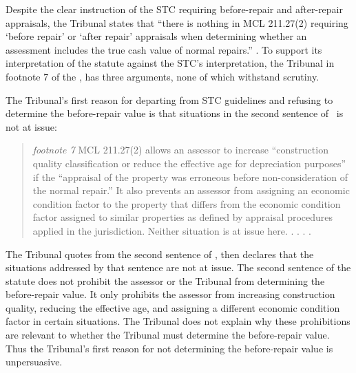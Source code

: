 \documentclass[12pt,\documentclassflag]{michiganCourtOfAppealsBrief}
\begin{document}
Despite the clear instruction of the STC requiring before-repair and after-repair appraisals, the Tribunal states that ``there is nothing in MCL 211.27(2) requiring `before repair' or `after repair' appraisals when determining whether an assessment includes the true cash value of normal repairs.'' \reconsiderationDenied[2]. To support its interpretation of the statute against the STC's interpretation,  the Tribunal in footnote 7 of the \reconsiderationDenied[2], has three arguments, none of which withstand scrutiny.

The Tribunal's first reason for departing from STC guidelines and refusing to determine the before-repair value is that situations in the second sentence of \mathieuGast\ is not at issue:

\begin{quote}
  {\em footnote 7} MCL 211.27(2) allows an assessor to increase ``construction quality classification or reduce the effective age for depreciation purposes'' if the ``appraisal of the property was erroneous before non-consideration of the normal repair.'' It also prevents an assessor from assigning an economic condition factor to the property that differs from the economic condition factor assigned to similar properties as defined by appraisal procedures applied in the jurisdiction. Neither situation is at issue here. . . . \reconsiderationDenied[2].
\end{quote}

The Tribunal quotes from the second sentence of \mathieuGast, then declares that the situations addressed by that sentence are not at issue. The second sentence of the statute does not prohibit the assessor or the Tribunal from determining the before-repair value. It only prohibits the assessor from increasing construction quality, reducing the effective age, and assigning a different economic condition factor in certain situations. 
The Tribunal does not explain why these prohibitions are relevant to whether the Tribunal must determine the before-repair value.
Thus the Tribunal's first reason for not determining the before-repair value is unpersuasive. %
\end{document}
